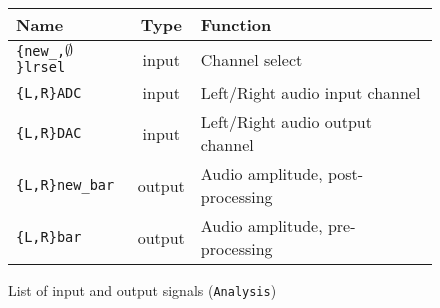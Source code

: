 \begin{figure}[h]
  \centering
  \caption{List of input and output signals (\texttt{Analysis})}
  \begin{tabular}{|l|c|l|}
    \hline
    Name & Type & Function \\    \hline
    \texttt{\{new\_,$\emptyset$\}lrsel} & input & Channel select \\    \hline
    \verb+{L,R}ADC+ & input & Left/Right audio input channel \\    \hline
    \verb+{L,R}DAC+ & input & Left/Right audio output channel \\    \hline
    \verb+{L,R}new_bar+ & output & Audio amplitude, post-processing\\    \hline
    \verb+{L,R}bar+ & output & Audio amplitude, pre-processing\\    \hline
  \end{tabular}
\end{figure}